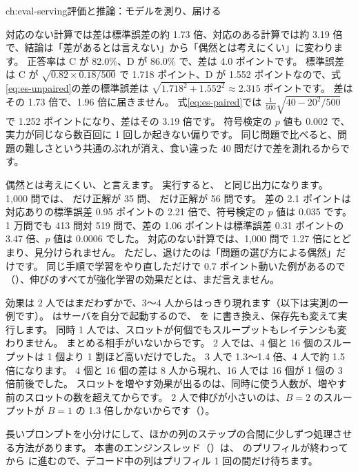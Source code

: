 \begin{answers}{ch:eval-serving}{評価と推論：モデルを測り、届ける}
\item 対応のない計算では差は標準誤差の約 1.73 倍、対応のある計算では約 3.19 倍で、結論は「差があるとは言えない」から「偶然とは考えにくい」に変わります。
正答率は C が 82.0\%、D が 86.0\% で、差は 4.0 ポイントです。
標準誤差は C が $\sqrt{0.82\times0.18/500}$ で 1.718 ポイント、D が 1.552 ポイントなので、式\eqref{eq:es-unpaired}の差の標準誤差は $\sqrt{1.718^2+1.552^2}\approx2.315$ ポイントです。
差はその 1.73 倍で、1.96 倍に届きません。
式\eqref{eq:es-paired}では $\frac{1}{500}\sqrt{40-20^2/500}$ で 1.252 ポイントになり、差はその 3.19 倍です。
符号検定の $p$ 値も 0.002 で、実力が同じなら数百回に 1 回しか起きない偏りです。
同じ問題で比べると、問題の難しさという共通のぶれが消え、食い違った 40 問だけで差を測れるからです。
\item 偶然とは考えにくい、と言えます。
実行すると、 と同じ出力になります。
1,000 問では、 だけ正解が 35 問、 だけ正解が 56 問です。
差の 2.1 ポイントは対応ありの標準誤差 0.95 ポイントの 2.21 倍で、符号検定の $p$ 値は 0.035 です。
1 万問でも 413 問対 519 問で、差の 1.06 ポイントは標準誤差 0.31 ポイントの 3.47 倍、$p$ 値は 0.0006 でした。
対応のない計算では、1,000 問で 1.27 倍にとどまり、見分けられません。
ただし、退けたのは「問題の選び方による偶然」だけです。
同じ手順で学習をやり直しただけで 0.7 ポイント動いた例があるので（）、伸びのすべてが強化学習の効果だとは、まだ言えません。
\item 効果は 2 人ではまだわずかで、3〜4 人からはっきり現れます（以下は実測の一例です）。
 はサーバを自分で起動するので、 を \code{[1, 4, 16]} に書き換え、保存先も変えて実行します。
同時 1 人では、スロットが何個でもスループットもレイテンシも変わりません。
まとめる相手がいないからです。
2 人では、4 個と 16 個のスループットは 1 個より 1 割ほど高いだけでした。
3 人で 1.3〜1.4 倍、4 人で約 1.5 倍になります。
4 個と 16 個の差は 8 人から現れ、16 人では 16 個が 1 個の 3 倍前後でした。
スロットを増やす効果が出るのは、同時に使う人数が、増やす前のスロットの数を超えてからです。
2 人で伸びが小さいのは、$B=2$ のスループットが $B=1$ の 1.3 倍しかないからです（）。
\item 長いプロンプトを小分けにして、ほかの列のステップの合間に少しずつ処理させる方法があります。
本書のエンジンスレッド（）は、 のプリフィルが終わってから  に進むので、デコード中の列はプリフィル 1 回の間だけ待ちます。

\end{answers}
